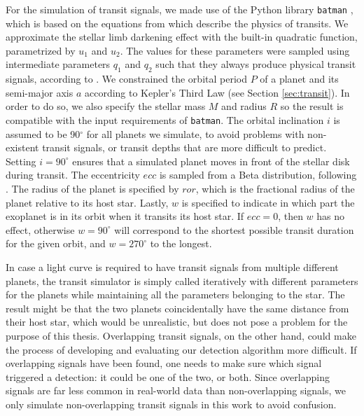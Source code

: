 For the simulation of transit signals, we made use of the Python library \texttt{batman} \citep{kreidberg2015batman}, which is based on the equations from \cite{mandel2002analytic} which describe the physics of transits. We approximate the stellar limb darkening effect with the built-in quadratic function, parametrized by $u_1$ and $u_2$. The values for these parameters were sampled using intermediate parameters $q_1$ and $q_2$ such that they always produce physical transit signals, according to \cite{kipping2013efficient}. We constrained the orbital period $P$ of a planet and its semi-major axis $a$ according to Kepler's Third Law (see Section \ref{sec:transit}). In order to do so, we also specify the stellar mass $M$ and radius $R$ so the result is compatible with the input requirements of \texttt{batman}. The orbital inclination $i$ is assumed to be 90$^\circ$ for all planets we simulate, to avoid problems with non-existent transit signals, or transit depths that are more difficult to predict. Setting $i=90^\circ$ ensures that a simulated planet moves in front of the stellar disk during transit. The eccentricity $ecc$ is sampled from a Beta distribution, following \cite{kipping2013parametrizing}. The radius of the planet is specified by $ror$, which is the fractional radius of the planet relative to its host star. Lastly, $w$ is specified to indicate in which part the exoplanet is in its orbit when it transits its host star. If $ecc=0$, then $w$ has no effect, otherwise $w=90^\circ$ will correspond to the shortest possible transit duration for the given orbit, and $w=270^\circ$ to the longest.

In case a light curve is required to have transit signals from multiple different planets, the transit simulator is simply called iteratively with different parameters for the planets while maintaining all the parameters belonging to the star. The result might be that the two planets coincidentally have the same distance from their host star, which would be unrealistic, but does not pose a problem for the purpose of this thesis. Overlapping transit signals, on the other hand, could make the process of developing and evaluating our detection algorithm more difficult. If overlapping signals have been found, one needs to make sure which signal triggered a detection: it could be one of the two, or both. Since overlapping signals are far less common in real-world data than non-overlapping signals, we only simulate non-overlapping transit signals in this work to avoid confusion.

